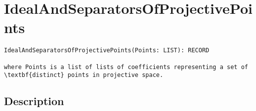 \documentclass[a4paper]{mybook}
\newenvironment{command}{}{} %
\begin{document}
\section{IdealAndSeparatorsOfProjectivePoints}
\label{IdealAndSeparatorsOfProjectivePoints}
\begin{command} %


\begin{Verbatim}[label=syntax, rulecolor=\color{MidnightBlue},
frame=single]
IdealAndSeparatorsOfProjectivePoints(Points: LIST): RECORD

where Points is a list of lists of coefficients representing a set of
\textbf{distinct} points in projective space.
\end{Verbatim}


\subsection*{Description}


\end{command}
\end{document}
